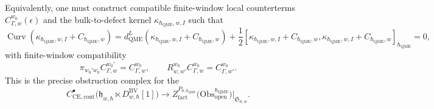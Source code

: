 \documentclass[11pt]{memoir}
\begin{document}
\begin{prob}
  Equivalently, one must construct compatible
	  finite-window local counterterms \(C_{\Gamma,w}^{w_0}(\epsilon)\) and
	  the bulk-to-defect kernel \(\kappa_{\hbar_{\mathrm{QME}},w,I}\) such that
	  \[
	    \operatorname{Curv}(\kappa_{\hbar_{\mathrm{QME}},w,I}+C_{\hbar_{\mathrm{QME}},w})
	      =
	      d_{\mathrm{QME}}^{L}(\kappa_{\hbar_{\mathrm{QME}},w,I}+C_{\hbar_{\mathrm{QME}},w})
	      +\frac12[\kappa_{\hbar_{\mathrm{QME}},w,I}+C_{\hbar_{\mathrm{QME}},w},
	        \kappa_{\hbar_{\mathrm{QME}},w,I}+C_{\hbar_{\mathrm{QME}},w}]_{\hbar_{\mathrm{QME}}}
      =0,
  \]
  with finite-window compatibility
  \[
    \pi_{w_0'w_0}C_{\Gamma,w}^{w_0'}=C_{\Gamma,w}^{w_0},\qquad
    R^{w_0}_{w,w'}C_{\Gamma,w}^{w_0}=C_{\Gamma,w'}^{w_0}.
  \]
  This is the precise obstruction complex for the
  \[
    C^\bullet_{\mathrm{CE},\mathrm{cont}}\bigl(
	      \mathfrak h_{w,\hbar}\ltimes
	      D^{\mathrm{BV}}_{w,\hbar}[1]\bigr)
	    \longrightarrow
	    Z^{P_{0,\hbar_{\mathrm{QME}}}}_{\mathrm{fact}}
	      \bigl(\mathrm{Obs}^{\hbar_{\mathrm{QME}}}_{\mathrm{open}}\bigr)|_{\mathfrak S_{\hbar,w}}.
	  \]
\end{prob}
\end{document}
